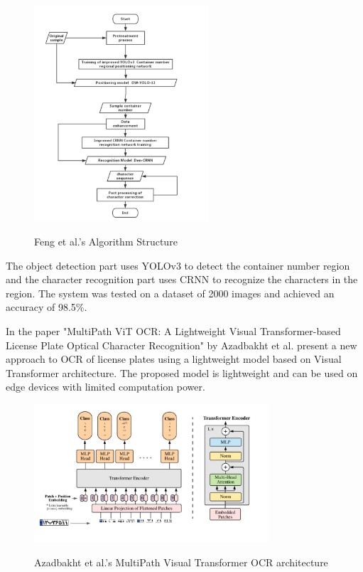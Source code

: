 \begin{figure}[ht]
    \centering
    \includegraphics[width=0.58\textwidth]{Figures/CRNN_Papers/Feng_2020.jpg}
    \caption[Feng et al.'s Algorithm Structure]{Feng et al.'s Algorithm Structure}\cite{fengPortContainerNumber2020}
    \label{fig:Feng et al.'s Algorithm Structure}
\end{figure}

The object detection part uses YOLOv3 to detect the container number region and the character recognition part uses CRNN to recognize the characters in the region.  The system was tested on a dataset of 2000 images and achieved an accuracy of 98.5\%.\cite{fengPortContainerNumber2020}



In the paper "MultiPath ViT OCR: A Lightweight Visual Transformer-based License Plate Optical Character Recognition" by Azadbakht et al. present a new approach to OCR of license plates using a lightweight model based on Visual Transformer architecture. The proposed model is lightweight and can be used on edge devices with limited computation power.


\begin{figure}[ht]
    \centering
    \includegraphics[width=0.78\textwidth]{Figures/CRNN_Papers/Azadbakht_2022.jpg}
    \caption[Azadbakht et al.'s MultiPath Visual Transformer OCR architecture]{Azadbakht et al.'s MultiPath Visual Transformer OCR architecture}\cite{azadbakhtMultiPathViTOCR2022}
    \label{fig:Azadbakht et al.'s MultiPath Visual Transformer OCR architecture}
\end{figure}

